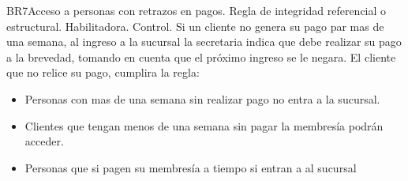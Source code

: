 \begin{BussinesRule}{BR7}{Acceso a personas con retrazos en pagos.}
	\BRitem[Tipo:] Regla de integridad referencial o estructural.
	\BRitem[Clase:] Habilitadora. 
	\BRitem[Nivel:] Control. %
	\BRitem[Descripción:] Si un cliente no genera su pago par mas de una semana, al ingreso a la sucursal la secretaria indica que debe realizar su pago a la brevedad, tomando en cuenta que el próximo ingreso se le negara.
	 El cliente que no relice su pago, cumplira la regla:
		\begin{itemize}
			\item Personas con mas de una semana sin realizar pago no entra a la sucursal.
			\item Clientes que tengan menos de una semana sin pagar la membresía podrán acceder.
		\end{itemize}
	
		\begin{itemize}
			\item Personas que si pagen su membresía a tiempo si entran a al sucursal
		\end{itemize}
	
\end{BussinesRule}

